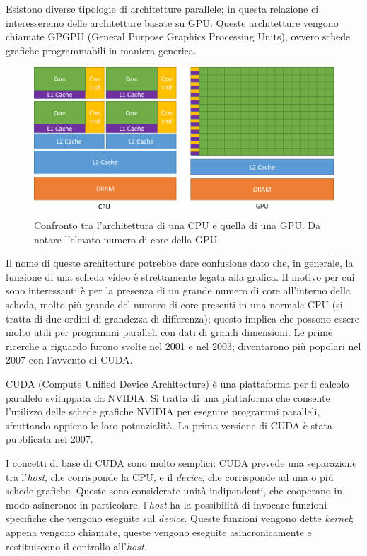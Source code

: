 \documentclass[12pt,a4paper,openright,twoside]{report}
\begin{document}
Esistono diverse tipologie di architetture parallele; in questa relazione ci interesseremo delle architetture basate su GPU. Queste architetture vengono chiamate GPGPU (General Purpose Graphics Processing Units), ovvero schede grafiche programmabili in maniera generica.

\begin{figure}[h]
\centering{}
\includegraphics[width=\textwidth]{cpu-gpu-comparison.png}
\caption{Confronto tra l'architettura di una CPU e quella di una GPU. Da notare l'elevato numero di core della GPU.}
\label{img:trend_proc}
\end{figure}

Il nome di queste architetture potrebbe dare confusione dato che, in generale, la funzione di una scheda video è strettamente legata alla grafica. Il motivo per cui sono interessanti è per la presenza di un grande numero di core all'interno della scheda, molto più grande del numero di core presenti in una normale CPU (si tratta di due ordini di grandezza di differenza); questo implica che possono essere molto utili per programmi paralleli con dati di grandi dimensioni. Le prime ricerche a riguardo furono svolte nel 2001 e nel 2003; diventarono più popolari nel 2007 con l'avvento di CUDA.

CUDA (Compute Unified Device Architecture) è una piattaforma per il calcolo parallelo sviluppata da NVIDIA. Si tratta di una piattaforma che consente l'utilizzo delle schede grafiche NVIDIA per eseguire programmi paralleli, sfruttando appieno le loro potenzialità. La prima versione di CUDA è stata pubblicata nel 2007.

I concetti di base di CUDA sono molto semplici: CUDA prevede una separazione tra l'\textit{host}, che corrisponde la CPU, e il \textit{device}, che corrisponde ad una o più schede grafiche. Queste sono considerate unità indipendenti, che cooperano in modo asincrono: in particolare, l'\textit{host} ha la possibilità di invocare funzioni specifiche che vengono eseguite sul \textit{device}. Queste funzioni vengono dette \textit{kernel}; appena vengono chiamate, queste vengono eseguite asincronicamente e restituiscono il controllo all'\textit{host}.
\end{document}
